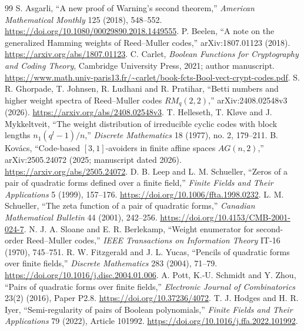 \documentclass[11pt]{article}
\theoremstyle{remark}
\begin{document}
\begingroup
\small
\raggedright
\setlength{\parskip}{0.25em}
\begin{thebibliography}{99}
 S. Asgarli, ``A new proof of Warning's second theorem,'' \emph{American Mathematical Monthly} 125 (2018), 548--552. \url{https://doi.org/10.1080/00029890.2018.1449555}.
 P. Beelen, ``A note on the generalized Hamming weights of Reed--Muller codes,'' arXiv:1807.01123 (2018). \url{https://arxiv.org/abs/1807.01123}.
 C. Carlet, \emph{Boolean Functions for Cryptography and Coding Theory}, Cambridge University Press, 2021; author manuscript. \url{https://www.math.univ-paris13.fr/~carlet/book-fcts-Bool-vect-crypt-codes.pdf}.
 S. R. Ghorpade, T. Johnsen, R. Ludhani and R. Pratihar, ``Betti numbers and higher weight spectra of Reed--Muller codes $RM_q(2,2)$,'' arXiv:2408.02548v3 (2026). \url{https://arxiv.org/abs/2408.02548v3}.
 T. Helleseth, T. Kløve and J. Mykkeltveit, ``The weight distribution of irreducible cyclic codes with block lengths $n_1(q^l-1)/n$,'' \emph{Discrete Mathematics} 18 (1977), no. 2, 179--211.
 B. Kovács, ``Code-based $[3,1]$-avoiders in finite affine spaces $AG(n,2)$,'' arXiv:2505.24072 (2025; manuscript dated 2026). \url{https://arxiv.org/abs/2505.24072}.
 D. B. Leep and L. M. Schueller, ``Zeros of a pair of quadratic forms defined over a finite field,'' \emph{Finite Fields and Their Applications} 5 (1999), 157--176. \url{https://doi.org/10.1006/ffta.1998.0232}.
 L. M. Schueller, ``The zeta function of a pair of quadratic forms,'' \emph{Canadian Mathematical Bulletin} 44 (2001), 242--256. \url{https://doi.org/10.4153/CMB-2001-024-7}.
 N. J. A. Sloane and E. R. Berlekamp, ``Weight enumerator for second-order Reed--Muller codes,'' \emph{IEEE Transactions on Information Theory} IT-16 (1970), 745--751.
 R. W. Fitzgerald and J. L. Yucas, ``Pencils of quadratic forms over finite fields,'' \emph{Discrete Mathematics} 283 (2004), 71--79. \url{https://doi.org/10.1016/j.disc.2004.01.006}.
 A. Pott, K.-U. Schmidt and Y. Zhou, ``Pairs of quadratic forms over finite fields,'' \emph{Electronic Journal of Combinatorics} 23(2) (2016), Paper P2.8. \url{https://doi.org/10.37236/4072}.
 T. J. Hodges and H. R. Iyer, ``Semi-regularity of pairs of Boolean polynomials,'' \emph{Finite Fields and Their Applications} 79 (2022), Article 101992. \url{https://doi.org/10.1016/j.ffa.2022.101992}.
\end{thebibliography}
\endgroup
\end{document}
